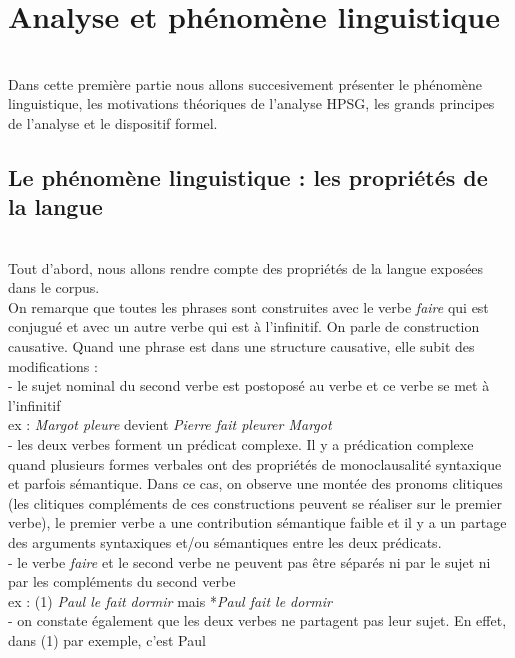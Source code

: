 %

\section {Analyse et phénomène linguistique}
	\\
	Dans cette première partie nous allons succesivement présenter le phénomène linguistique, les motivations théoriques de
	l'analyse HPSG, les grands principes de l'analyse et le dispositif formel. 	
	\\
\subsection{Le phénomène linguistique : les propriétés de la langue}
	\\
	Tout d'abord, nous allons rendre compte des propriétés de la langue exposées dans le corpus.\\
	On remarque que toutes les phrases sont construites avec le verbe \emph{faire} qui est conjugué et avec un autre verbe qui est
	à l'infinitif. On parle de construction causative. Quand une phrase est dans une structure causative, elle subit
	des modifications : \\
	- le sujet nominal du second verbe est postoposé au verbe et ce verbe se met à l'infinitif\\
	ex : \emph{Margot pleure} devient \emph{Pierre fait pleurer Margot}\\
	- les deux verbes forment un prédicat complexe. Il y a prédication complexe quand plusieurs formes verbales ont des 
	propriétés de monoclausalité syntaxique et parfois sémantique. Dans ce cas, on observe une montée des pronoms clitiques (les
	clitiques compléments de ces constructions peuvent se réaliser sur le premier verbe), le premier verbe a une contribution 
	sémantique faible et il y a un partage des arguments syntaxiques et/ou sémantiques entre les deux prédicats. \\
	- le verbe \emph{faire} et le second verbe ne peuvent pas être séparés ni par le sujet ni par les compléments du second verbe\\
	ex : (1) \emph{Paul le fait dormir} mais *\emph{Paul fait le dormir}\\
	- on constate également que les deux verbes ne partagent pas leur sujet. En effet, dans (1) par exemple, c'est Paul
